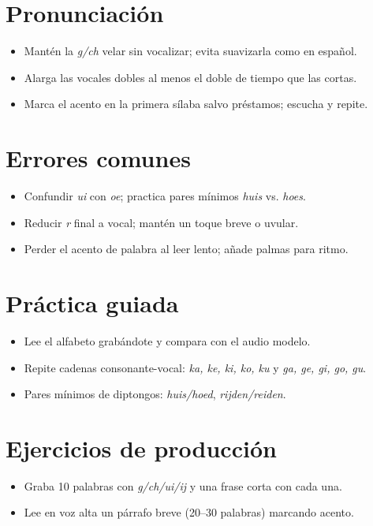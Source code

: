\section{Pronunciación}
\begin{itemize}[leftmargin=*]
	\item Mantén la \textit{g/ch} velar sin vocalizar; evita suavizarla como en español.
	\item Alarga las vocales dobles al menos el doble de tiempo que las cortas.
	\item Marca el acento en la primera sílaba salvo préstamos; escucha y repite.
\end{itemize}

\section{Errores comunes}
\begin{itemize}[leftmargin=*]
	\item Confundir \textit{ui} con \textit{oe}; practica pares mínimos \textit{huis} vs. \textit{hoes}.
	\item Reducir \textit{r} final a vocal; mantén un toque breve o uvular.
	\item Perder el acento de palabra al leer lento; añade palmas para ritmo.
\end{itemize}

\section{Práctica guiada}
\begin{itemize}[leftmargin=*]
	\item Lee el alfabeto grabándote y compara con el audio modelo.
	\item Repite cadenas consonante-vocal: \textit{ka, ke, ki, ko, ku} y \textit{ga, ge, gi, go, gu}.
	\item Pares mínimos de diptongos: \textit{huis/hoed}, \textit{rijden/reiden}.
\end{itemize}

\section{Ejercicios de producción}
\begin{itemize}[leftmargin=*]
	\item Graba 10 palabras con \textit{g/ch/ui/ij} y una frase corta con cada una.
	\item Lee en voz alta un párrafo breve (20--30 palabras) marcando acento.
\end{itemize}

